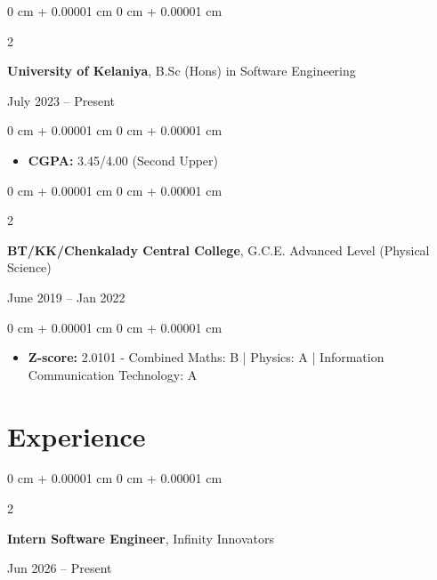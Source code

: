 \documentclass[10pt, letterpaper]{article}
\newenvironment{highlights}{
    \begin{itemize}[
        topsep=0.08 cm,
        parsep=0.08 cm,
        partopsep=0pt,
        itemsep=0pt,
        leftmargin=0 cm + 10pt
    ]
}{
    \end{itemize}
} %
\newenvironment{onecolentry}{
    \begin{adjustwidth}{
        0 cm + 0.00001 cm
    }{
        0 cm + 0.00001 cm
    }
}{
    \end{adjustwidth}
} %
\newenvironment{twocolentry}[2][]{
    \onecolentry
    \def\secondColumn{#2}
    \setcolumnwidth{\fill, 4.5 cm}
    \begin{paracol}{2}
}{
    \switchcolumn \raggedleft \secondColumn
    \end{paracol}
    \endonecolentry
} %
\begin{document}
        \begin{twocolentry}{
            July 2023 – Present
        }
            \textbf{University of Kelaniya}, B.Sc (Hons) in Software Engineering
        \end{twocolentry}

        \vspace{0.10 cm}
        \begin{onecolentry}
            \begin{highlights}
                \item \textbf{CGPA: } 3.45/4.00 (Second Upper)
            \end{highlights}
        \end{onecolentry}

        \vspace{0.10 cm}
        \begin{twocolentry}{
            June 2019 – Jan 2022
        }
            \textbf{BT/KK/Chenkalady Central College}, G.C.E. Advanced Level (Physical Science)
        \end{twocolentry}

        \vspace{0.10 cm}
        \begin{onecolentry}
            \begin{highlights}
                \item \textbf{Z-score: }2.0101 - Combined Maths: B | Physics: A | Information Communication Technology: A
            \end{highlights}
        \end{onecolentry}

    \section{Experience}

    \begin{twocolentry}{
            Jun 2026 – Present
        }
            \textbf{Intern Software Engineer}, Infinity Innovators
    \end{twocolentry}
\end{document}
